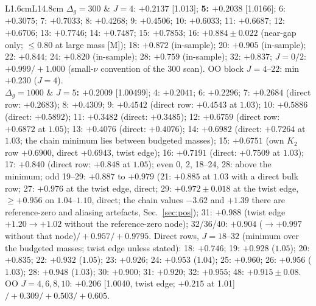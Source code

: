 \documentclass[aps,prl,onecolumn,superscriptaddress,nofootinbib]{revtex4-2}
\begin{document}
\begin{table}[!htbp]
\caption{\label{tab:Dstates}$\Omega^{EE}$: minimum $\lambda/N_s$ per state over the masses (twist edge
to $5\Lambda$); brackets: $m/\Lambda$ at the minimum. ``in-sample'' = seen before the functional was
fixed. Published chain values; values from direct rows (Table~\ref{tab:computed}) in parentheses.}
\footnotesize
\begin{ruledtabular}
\begin{tabular}{L{1.6cm}L{14.8cm}}
$\Delta_g=300$ & $J=4$: $+0.2137$ [1.013]; \textbf{5: $+0.2038$} [1.0166]; 6: $+0.3075$; 7: $+0.7033$; 8: $+0.4268$; 9: $+0.4506$; 10: $+0.6033$;
11: $+0.6687$; 12: $+0.6706$; 13: $+0.7746$; 14: $+0.7487$; 15: $+0.7853$; 16: $+0.884\pm0.022$ (near-gap only; $\le0.80$ at large
mass [M]); 18: $+0.872$ (in-sample); 20: $+0.905$ (in-sample); 22: $+0.844$; 24: $+0.820$ (in-sample); 28: $+0.759$ (in-sample);
32: $+0.837$; $J=0/2$: $+0.999/+1.000$ (small-$\nu$ convention of the $300$ scan). OO block $J=4$--$22$: min $+0.230$ ($J=4$).\\
$\Delta_g=1000$ & \textbf{$J=5$: $+0.2009$} [1.00499]; 4: $+0.2041$; 6: $+0.2296$; 7: $+0.2684$ (direct row: $+0.2683$); 8: $+0.4309$; 9: $+0.4542$ (direct row: $+0.4543$ at $1.03$); 10: $+0.5886$ (direct: $+0.5892$); 11: $+0.3482$ (direct: $+0.3485$);
12: $+0.6759$ (direct row: $+0.6872$ at $1.05$); 13: $+0.4076$ (direct: $+0.4076$); 14: $+0.6982$ (direct: $+0.7264$ at $1.03$; the chain minimum lies between budgeted masses); 15: $+0.6751$ (own $K_2$ row $+0.6900$, direct $+0.6943$, twist edge); 16: $+0.7191$ (direct: $+0.7509$ at $1.03$);
17: $+0.840$ (direct row: $+0.848$ at $1.05$); even 0, 2, 18--24, 28: above the minimum; odd 19--29: $+0.887$ to $+0.979$ (21: $+0.885$ at $1.03$ with a direct bulk row; 27: $+0.976$ at the twist edge, direct; 29: $+0.972\pm0.018$ at the twist edge, $\ge+0.956$ on $1.04$--$1.10$, direct; the chain values $-3.62$ and $+1.39$ there are reference-zero and aliasing artefacts, Sec.~\ref{sec:pos}); 31: $+0.988$ (twist edge $+1.20\to+1.02$ without the reference-zero node); 32/36/40: $+0.904$ ($\to+0.997$ without that node)$/+0.957/+0.9795$. Direct rows, $J=18$--$32$ (minimum over the budgeted masses; twist edge unless stated): 18: $+0.746$; 19: $+0.928$ ($1.05$); 20: $+0.835$; 22: $+0.932$ ($1.05$); 23: $+0.926$; 24: $+0.953$ ($1.04$); 25: $+0.960$; 26: $+0.956$ ($1.03$); 28: $+0.948$ ($1.03$); 30: $+0.900$; 31: $+0.920$; 32: $+0.955$;
48: $+0.915\pm0.08$. OO $J=4,6,8,10$: $+0.206$ [1.0040, twist edge; $+0.215$ at 1.01]$/+0.309/+0.503/+0.605$.\\
\end{tabular}
\end{ruledtabular}
\end{table}
\end{document}

